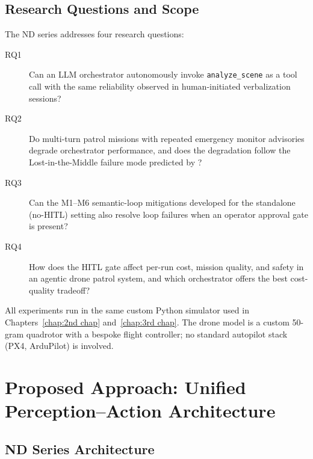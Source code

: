 \subsection{Research Questions and Scope}
\label{sec:ch4_problem_rq}

The ND series addresses four research questions:

\begin{description}
  \item[RQ1] Can an LLM orchestrator autonomously invoke \texttt{analyze\_scene} as a tool
    call with the same reliability observed in human-initiated verbalization sessions?

  \item[RQ2] Do multi-turn patrol missions with repeated emergency monitor advisories degrade
    orchestrator performance, and does the degradation follow the Lost-in-the-Middle failure
    mode predicted by \citet{liu2023lostinthemiddle}?

  \item[RQ3] Can the M1--M6 semantic-loop mitigations developed for the standalone (no-HITL)
    setting also resolve loop failures when an operator approval gate is present?

  \item[RQ4] How does the HITL gate affect per-run cost, mission quality, and safety in an
    agentic drone patrol system, and which orchestrator offers the best cost-quality tradeoff?
\end{description}

All experiments run in the same custom Python simulator used in Chapters~\ref{chap:2nd chap}
and~\ref{chap:3rd chap}.  The drone model is a custom 50-gram quadrotor with a bespoke
flight controller; no standard autopilot stack (PX4, ArduPilot) is involved.

\section{Proposed Approach: Unified Perception--Action Architecture}
\label{sec:ch4_proposed}

\subsection{ND Series Architecture}
\label{sec:ch4_proposed_arch}

